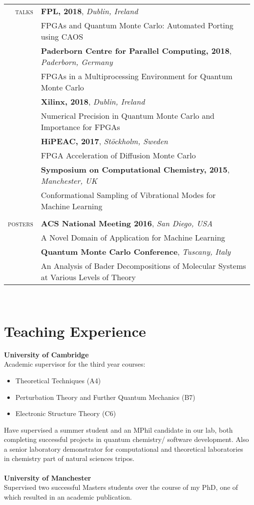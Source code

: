 \documentclass[11pt]{article} %
\begin{document}
\begin{tabular}{rl}
	\textsc{talks} 
    & \textbf{FPL, 2018}, \textit{Dublin, Ireland}\\
    & FPGAs and Quantum Monte Carlo: Automated Porting using CAOS\\
    & \textbf{Paderborn Centre for Parallel Computing, 2018}, \textit{Paderborn, Germany}\\
    & FPGAs in a Multiprocessing Environment for Quantum Monte Carlo\\
	& \textbf{Xilinx, 2018}, \textit{Dublin, Ireland}\\
    & Numerical Precision in Quantum Monte Carlo and Importance for FPGAs\\
    & \textbf{HiPEAC, 2017}, \textit{St\"{o}ckholm, Sweden}\\
    & FPGA Acceleration of Diffusion Monte Carlo\\
    & \textbf{Symposium on Computational Chemistry, 2015}, \textit{Manchester, UK}\\
    & Conformational Sampling of Vibrational Modes for Machine Learning\\
    \\
    \textsc{posters} & \textbf{ACS National Meeting 2016}, \textit{San Diego, USA}\\
    & A Novel Domain of Application for Machine Learning\\
    & \textbf{Quantum Monte Carlo Conference}, \textit{Tuscany, Italy}\\
    & An Analysis of Bader Decompositions of Molecular Systems at Various Levels of Theory\\
\end{tabular}\\

\section{Teaching Experience}

\textbf{University of Cambridge}\\
Academic supervisor for the third year courses:
\begin{itemize}
	\item Theoretical Techniques (A4)
    \item Perturbation Theory and Further Quantum Mechanics (B7)
    \item Electronic Structure Theory (C6)
\end{itemize}
Have supervised a summer student and an MPhil candidate in our lab, both completing successful projects in quantum chemistry/ software development. Also a senior laboratory demonstrator for computational and theoretical laboratories in chemistry part of natural sciences tripos.\\
\\
\textbf{University of Manchester}\\
Supervised two successful Masters students over the course of my PhD, one of which resulted in an academic publication.\\
\end{document}
